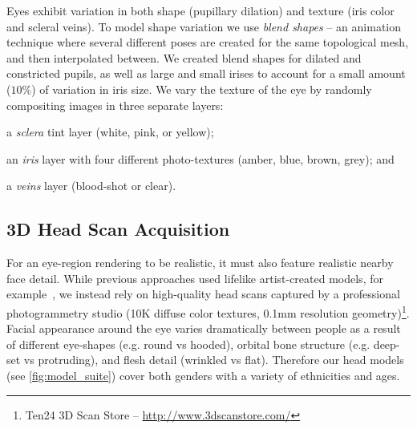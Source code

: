 Eyes exhibit variation in both shape (pupillary dilation) and texture (iris color and scleral veins).
To model shape variation we use \emph{blend shapes} -- an animation technique where several different poses are created for the same topological mesh, and then interpolated between\cite{orvalho2012facial}. 
We created blend shapes for dilated and constricted pupils, as well as large and small irises to account for a small amount ($10\%$) of variation in iris size.
We vary the texture of the eye by randomly compositing images in three separate layers:
\begin{inparaenum}
\item a \emph{sclera} tint layer (white, pink, or yellow);
\item an \emph{iris} layer with four different photo-textures (amber, blue, brown, grey); and
\item a \emph{veins} layer (blood-shot or clear).
\end{inparaenum}

\subsection{3D Head Scan Acquisition}
\label{sec:eye_region_geom_prep}

For an eye-region rendering to be realistic, it must also feature realistic nearby face detail.
While previous approaches used lifelike artist-created models, for example~\cite{swirski2014rendering}, we instead rely on high-quality head scans captured by a professional photogrammetry studio (10K diffuse color textures, 0.1mm resolution geometry)\footnote{Ten24 3D Scan Store -- \url{http://www.3dscanstore.com/}}.
Facial appearance around the eye varies dramatically between people as a result of different eye-shapes (e.g. round vs hooded), orbital bone structure (e.g. deep-set vs protruding), and flesh detail (wrinkled vs flat). Therefore our head models (see \autoref{fig:model_suite}) cover both genders with a variety of ethnicities and ages.

